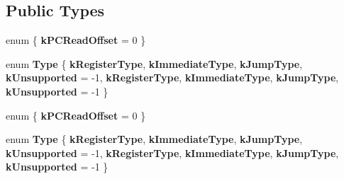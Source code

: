 \subsection*{Public Types}
\begin{DoxyCompactItemize}
\item 
\mbox{\label{classv8_1_1internal_1_1InstructionBase_ab7cbe67a29bc61a444b1c6dc566670b4}} 
enum \{ {\bfseries k\+P\+C\+Read\+Offset} = 0
 \}
\item 
\mbox{\label{classv8_1_1internal_1_1InstructionBase_a5e37f32c9f2865606c1721fc63f467d1}} 
enum {\bfseries Type} \{ \newline
{\bfseries k\+Register\+Type}, 
{\bfseries k\+Immediate\+Type}, 
{\bfseries k\+Jump\+Type}, 
{\bfseries k\+Unsupported} = -\/1, 
\newline
{\bfseries k\+Register\+Type}, 
{\bfseries k\+Immediate\+Type}, 
{\bfseries k\+Jump\+Type}, 
{\bfseries k\+Unsupported} = -\/1
 \}
\item 
\mbox{\label{classv8_1_1internal_1_1InstructionBase_a5eb13c6b026f17150ed8bcb4f81936d9}} 
enum \{ {\bfseries k\+P\+C\+Read\+Offset} = 0
 \}
\item 
\mbox{\label{classv8_1_1internal_1_1InstructionBase_a5e37f32c9f2865606c1721fc63f467d1}} 
enum {\bfseries Type} \{ \newline
{\bfseries k\+Register\+Type}, 
{\bfseries k\+Immediate\+Type}, 
{\bfseries k\+Jump\+Type}, 
{\bfseries k\+Unsupported} = -\/1, 
\newline
{\bfseries k\+Register\+Type}, 
{\bfseries k\+Immediate\+Type}, 
{\bfseries k\+Jump\+Type}, 
{\bfseries k\+Unsupported} = -\/1
 \}
\end{DoxyCompactItemize}
